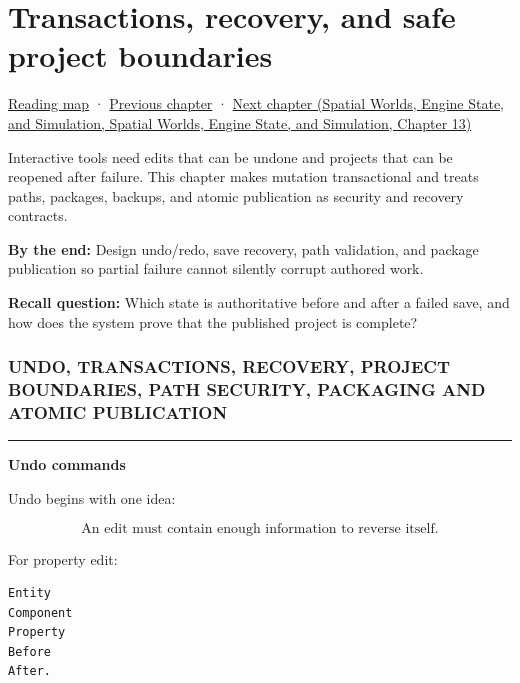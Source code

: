 \hypertarget{05-engine-i-ch012}{}
\chapter{Transactions, recovery, and safe project boundaries}\label{stagechapter:05-engine-i-ch012}\label{05-engine-i-ch012-transactions-recovery-and-safe-project-boundaries}

\hyperref[volume-reading-map]{Reading map} · \hyperref[05-engine-i-ch011-streaming-resources-through-explicit-states]{Previous chapter} · \href{../05-Spatial-Worlds-Engine-State-and-Simulation/main.pdf\#nameddest=05-engine-i-ch013-portable-startup-windows-events-and-input}{Next chapter (Spatial Worlds, Engine State, and Simulation, Spatial Worlds, Engine State, and Simulation, Chapter 13)}

Interactive tools need edits that can be undone and projects that can be reopened after failure. This chapter makes mutation transactional and treats paths, packages, backups, and atomic publication as security and recovery contracts.

\textbf{By the end:} Design undo/redo, save recovery, path validation, and package publication so partial failure cannot silently corrupt authored work.

\textbf{Recall question:} Which state is authoritative before and after a failed save, and how does the system prove that the published project is complete?

\subsection{UNDO, TRANSACTIONS, RECOVERY, PROJECT BOUNDARIES, PATH SECURITY, PACKAGING AND ATOMIC PUBLICATION}\label{05-engine-i-ch012-undo-transactions-recovery-project-boundaries-path-security-packaging-and-atomic-publication}

\begin{center}\rule{0.5\linewidth}{0.5pt}\end{center}

\textbf{Undo commands}

Undo begins with one idea:

\[
\boxed{
\text{An edit must contain enough information to reverse itself.}
}
\]

For property edit:

\begin{verbatim}
Entity
Component
Property
Before
After.
\end{verbatim}

